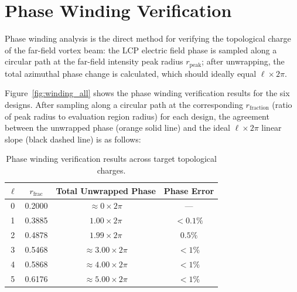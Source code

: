 

\section{Phase Winding Verification}

\label{sec:winding}

Phase winding analysis is the direct method for verifying the topological charge of the far-field vortex beam: the LCP electric field phase is sampled along a circular path at the far-field intensity peak radius $r_\text{peak}$; after unwrapping, the total azimuthal phase change is calculated, which should ideally equal $\ell \times 2\pi$.

Figure~\ref{fig:winding_all} shows the phase winding verification results for the six designs. After sampling along a circular path at the corresponding $r_\text{fraction}$ (ratio of peak radius to evaluation region radius) for each design, the agreement between the unwrapped phase (orange solid line) and the ideal $\ell \times 2\pi$ linear slope (black dashed line) is as follows:
\begin{table}[htb]
\centering
\caption{Phase winding verification results across target topological charges.}
\label{tab:phase_winding}
\begin{tabular}{cccc}
\toprule
$\ell$ & $r_\text{frac}$ & Total Unwrapped Phase & Phase Error \\
\midrule
0 & 0.2000 & $\approx 0 \times 2\pi$ & --- \\
1 & 0.3885 & $1.00 \times 2\pi$ & $< 0.1\%$ \\
2 & 0.4878 & $1.99 \times 2\pi$ & $0.5\%$ \\
3 & 0.5468 & $\approx 3.00 \times 2\pi$ & $< 1\%$ \\
4 & 0.5868 & $\approx 4.00 \times 2\pi$ & $< 1\%$ \\
5 & 0.6176 & $\approx 5.00 \times 2\pi$ & $< 1\%$ \\
\bottomrule
\end{tabular}
\end{table}

